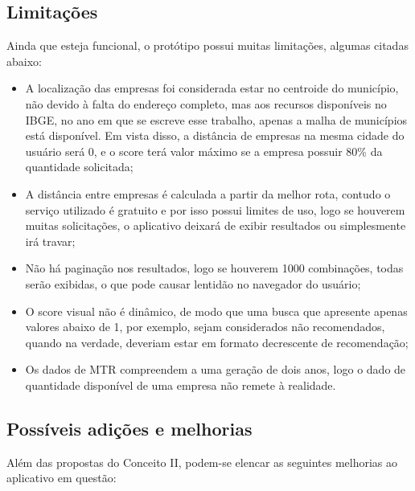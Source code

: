 \subsection{Limitações}

Ainda que esteja funcional, o protótipo possui muitas limitações, algumas citadas abaixo:

\begin{itemize} 
	\item A localização das empresas foi considerada estar no centroide do município, não devido à falta do endereço completo, mas aos recursos disponíveis no \gls{IBGE}, no ano em que se escreve esse trabalho, apenas a malha de municípios está disponível. Em vista disso, a distância de empresas na mesma cidade do usuário será 0, e o score terá valor máximo se a empresa possuir 80\% da quantidade solicitada;
  \item A distância entre empresas é calculada a partir da melhor rota, contudo o serviço utilizado é gratuito e por isso possui limites de uso, logo se houverem muitas solicitações, o aplicativo deixará de exibir resultados ou simplesmente irá travar;
  \item Não há paginação nos resultados, logo se houverem 1000 combinações, todas serão exibidas, o que pode causar lentidão no navegador do usuário;
  \item O score visual não é dinâmico, de modo que uma busca que apresente apenas valores abaixo de 1, por exemplo, sejam considerados não recomendados, quando na verdade, deveriam estar em formato decrescente de recomendação;
  \item Os dados de \gls{MTR} compreendem a uma geração de dois anos, logo o dado de quantidade disponível de uma empresa não remete à realidade.
\end{itemize}

\subsection{Possíveis adições e melhorias}

Além das propostas do Conceito II, podem-se elencar as seguintes melhorias ao aplicativo em questão:

